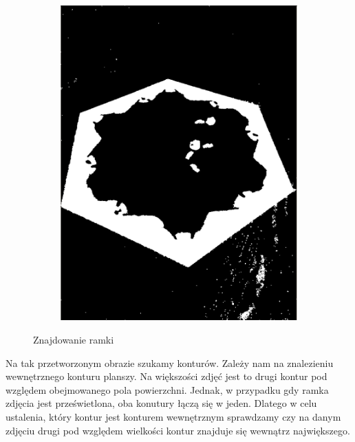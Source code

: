 \documentclass[a4paper]{article}
\begin{document}
\begin{figure}[H]
\begin{subfigure}[t]{.3\linewidth}
        \includegraphics[width=\linewidth]{pictures/steps/find_water_dilate.png}
        \end{subfigure}

        \caption{Znajdowanie ramki}
        \label{fig:step1a}
    \end{figure}

    Na tak przetworzonym obrazie szukamy konturów. Zależy nam na znalezieniu wewnętrznego konturu planszy. Na większości zdjęć jest to drugi kontur pod względem obejmowanego pola powierzchni. Jednak, w przypadku gdy ramka zdjęcia jest prześwietlona, oba konutury łączą się w jeden. Dlatego w celu ustalenia, który kontur jest konturem wewnętrznym sprawdzamy czy na danym zdjęciu drugi pod względem wielkości kontur znajduje się wewnątrz największego.
\end{document}
